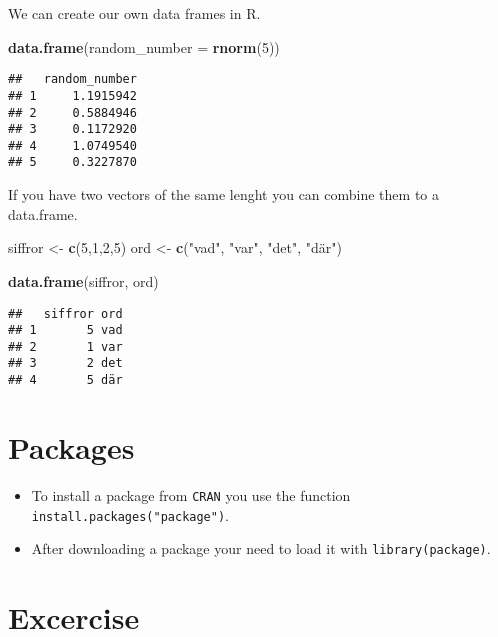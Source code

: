 \documentclass[]{book}
\newenvironment{Shaded}{\begin{snugshade}}{\end{snugshade}}
\newcommand{\DataTypeTok}[1]{\textcolor[rgb]{0.13,0.29,0.53}{#1}}
\newcommand{\DecValTok}[1]{\textcolor[rgb]{0.00,0.00,0.81}{#1}}
\newcommand{\KeywordTok}[1]{\textcolor[rgb]{0.13,0.29,0.53}{\textbf{#1}}}
\newcommand{\NormalTok}[1]{#1}
\newcommand{\StringTok}[1]{\textcolor[rgb]{0.31,0.60,0.02}{#1}}
\begin{document}
We can create our own data frames in R.

\begin{Shaded}
\begin{Highlighting}[]
\KeywordTok{data.frame}\NormalTok{(}\DataTypeTok{random_number =} \KeywordTok{rnorm}\NormalTok{(}\DecValTok{5}\NormalTok{))}
\end{Highlighting}
\end{Shaded}

\begin{verbatim}
##   random_number
## 1     1.1915942
## 2     0.5884946
## 3     0.1172920
## 4     1.0749540
## 5     0.3227870
\end{verbatim}

If you have two vectors of the same lenght you can combine them to a data.frame.

\begin{Shaded}
\begin{Highlighting}[]
\NormalTok{siffror <-}\StringTok{ }\KeywordTok{c}\NormalTok{(}\DecValTok{5}\NormalTok{,}\DecValTok{1}\NormalTok{,}\DecValTok{2}\NormalTok{,}\DecValTok{5}\NormalTok{)}
\NormalTok{ord <-}\StringTok{ }\KeywordTok{c}\NormalTok{(}\StringTok{"vad"}\NormalTok{, }\StringTok{"var"}\NormalTok{, }\StringTok{"det"}\NormalTok{, }\StringTok{"där"}\NormalTok{)}

\KeywordTok{data.frame}\NormalTok{(siffror, ord)}
\end{Highlighting}
\end{Shaded}

\begin{verbatim}
##   siffror ord
## 1       5 vad
## 2       1 var
## 3       2 det
## 4       5 där
\end{verbatim}

\hypertarget{packages}{%
\section{Packages}\label{packages}}

\begin{itemize}
\item
  To install a package from \texttt{CRAN} you use the function \texttt{install.packages("package")}.
\item
  After downloading a package your need to load it with \texttt{library(package)}.
\end{itemize}

\hypertarget{excercise}{%
\section{Excercise}\label{excercise}}
\end{document}

